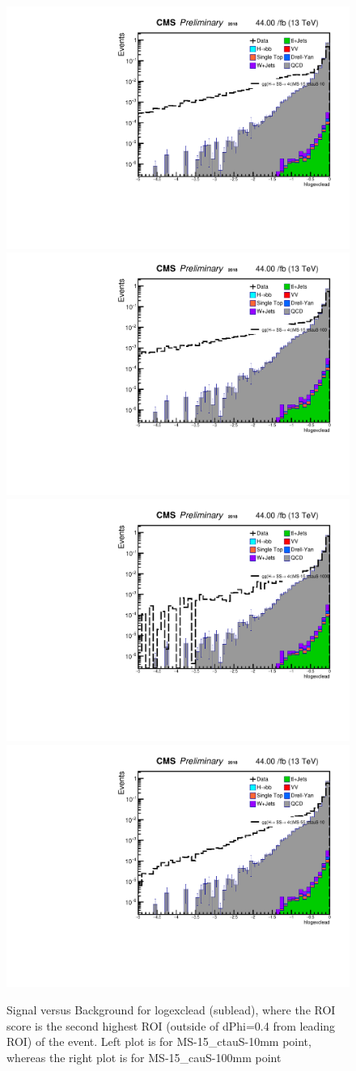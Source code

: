  \begin{figure}[h!]
	 \caption{Signal versus Background for logexclead (sublead), where the ROI score is the second highest ROI (outside of dPhi=0.4 from leading ROI) of the event. Left plot is for MS-15\_ctauS-10mm point, whereas the right plot is for MS-15\_cauS-100mm point}
   \label{fig:excROIscore}
   \centering
   \includegraphics[width=0.47\linewidth]{figs/log_Oct6ANVars_MS-15_ctauS-10_hlogexclead.pdf}
   \includegraphics[width=0.47\linewidth]{figs/log_Oct6ANVars_MS-15_ctauS-100_hlogexclead.pdf}
   \includegraphics[width=0.47\linewidth]{figs/log_Oct6ANVars_MS-15_ctauS-1000_hlogexclead.pdf}
   \includegraphics[width=0.47\linewidth]{figs/log_Oct6ANVars_MS-55_ctauS-10_hlogexclead.pdf}
 \end{figure}

